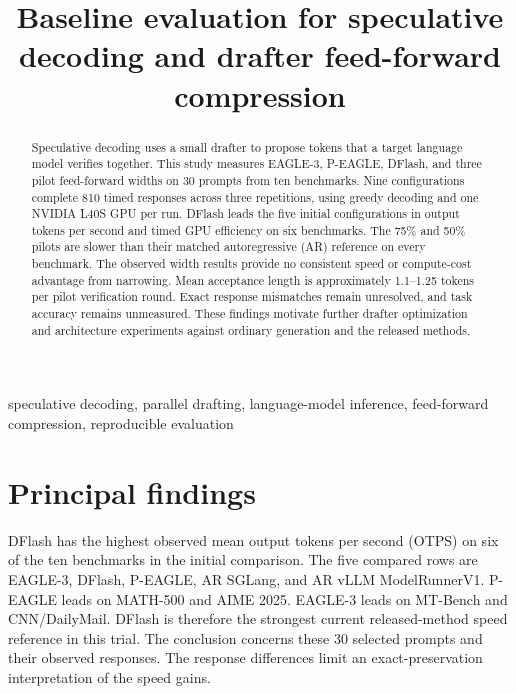 \documentclass[conference,onecolumn]{IEEEtran}
\begin{document}
\title{Baseline evaluation for speculative decoding and drafter feed-forward compression}
\author{
}
\maketitle
\thispagestyle{plain}

\begin{abstract}
Speculative decoding uses a small drafter to propose tokens that a target language model verifies together. This study measures EAGLE-3, P-EAGLE, DFlash, and three pilot feed-forward widths on 30 prompts from ten benchmarks. Nine configurations complete 810 timed responses across three repetitions, using greedy decoding and one NVIDIA L40S GPU per run. DFlash leads the five initial configurations in output tokens per second and timed GPU efficiency on six benchmarks. The 75\% and 50\% pilots are slower than their matched autoregressive (AR) reference on every benchmark. The observed width results provide no consistent speed or compute-cost advantage from narrowing. Mean acceptance length is approximately 1.1--1.25 tokens per pilot verification round. Exact response mismatches remain unresolved, and task accuracy remains unmeasured. These findings motivate further drafter optimization and architecture experiments against ordinary generation and the released methods.
\end{abstract}

\begin{IEEEkeywords}
speculative decoding, parallel drafting, language-model inference, feed-forward compression, reproducible evaluation
\end{IEEEkeywords}

\section{Principal findings}
DFlash has the highest observed mean output tokens per second (OTPS) on six of the ten benchmarks in the initial comparison. The five compared rows are EAGLE-3, DFlash, P-EAGLE, AR SGLang, and AR vLLM ModelRunnerV1. P-EAGLE leads on MATH-500 and AIME 2025. EAGLE-3 leads on MT-Bench and CNN/DailyMail. DFlash is therefore the strongest current released-method speed reference in this trial. The conclusion concerns these 30 selected prompts and their observed responses. The response differences limit an exact-preservation interpretation of the speed gains.
\end{document}
